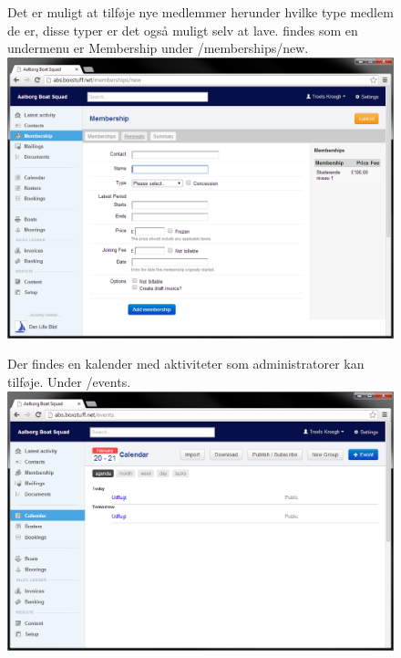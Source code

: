 \begin{figure}
	Det er muligt at tilføje nye medlemmer herunder hvilke type medlem de er, disse typer er det også muligt selv at lave. findes som en undermenu er Membership under /memberships/new.\newline
	\includegraphics[scale=0.5]{images/teknologi/_AddMember}
\end{figure}

\begin{figure}
	Der findes en kalender med aktiviteter som administratorer kan tilføje. Under /events.\newline
	\includegraphics[scale=0.5]{images/teknologi/_Calendar}
\end{figure}

